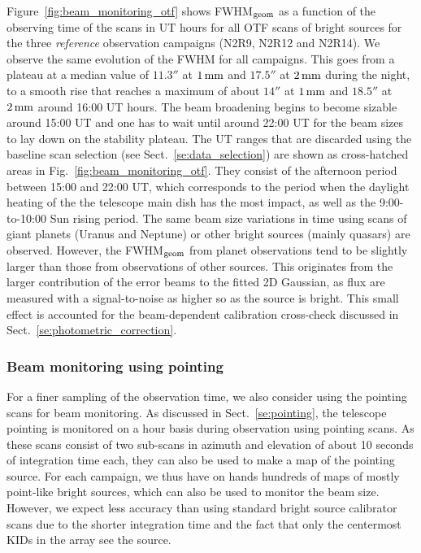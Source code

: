Figure~\ref{fig:beam_monitoring_otf} shows FWHM$_{\rm{geom}}$ as a
function of the observing time of the scans in UT hours for all OTF
scans of bright sources for the three \emph{reference} observation
campaigns (N2R9, N2R12 and N2R14). We observe the same evolution of
the FWHM for all campaigns.
This goes from a plateau at a median value of $11.3''$ at $1\,\rm{mm}$
and $17.5''$ at $2\,\rm{mm}$ during the night, to a smooth rise that
reaches a maximum of about $14''$ at $1\,\rm{mm}$ and $18.5''$ at
$2\,\rm{mm}$ around 16:00 UT
hours. The beam broadening begins to become sizable around 15:00 UT
and one has to wait until around 22:00 UT for the beam sizes to lay
down on the stability plateau. The UT ranges that are discarded
using the baseline scan selection (see
Sect.~\ref{se:data_selection}) are shown as cross-hatched areas in
Fig.~\ref{fig:beam_monitoring_otf}. They consist of the afternoon
period between 15:00 and 22:00 UT, which corresponds to the period
when the daylight heating of the the telescope main dish has the most
impact, as well as the 9:00-to-10:00 Sun rising period.
The same beam size variations in time using scans of giant planets (Uranus and
Neptune) or other bright
sources (mainly quasars) are observed. However, the FWHM$_{\rm{geom}}$ from planet
observations tend to be slightly larger than those from observations
of other sources. This originates from the larger contribution of the
error beams to the fitted 2D Gaussian, as flux are measured with 
a signal-to-noise as higher so as the source is bright. This small
effect is accounted for the beam-dependent calibration cross-check
discussed in Sect.~\ref{se:photometric_correction}.


\subsubsection{Beam monitoring using pointing}
\label{se:beam_monitoring_pointing}

For a finer sampling of the observation time, we also consider using
the pointing scans for beam monitoring. As discussed in
Sect.~\ref{se:pointing}, the telescope pointing is
monitored on a hour basis during observation using pointing
scans. As these scans consist of two sub-scans in azimuth and
elevation of about 10 seconds of integration time each, they
can also be used to make a map of the pointing source. For each campaign,
we thus have on hands hundreds of maps of mostly point-like bright
sources, which can also be used to monitor the beam size. However, we
expect less accuracy than using standard bright source calibrator scans due to the
shorter integration time and the fact that only the centermost KIDs in
the array see the source.  

